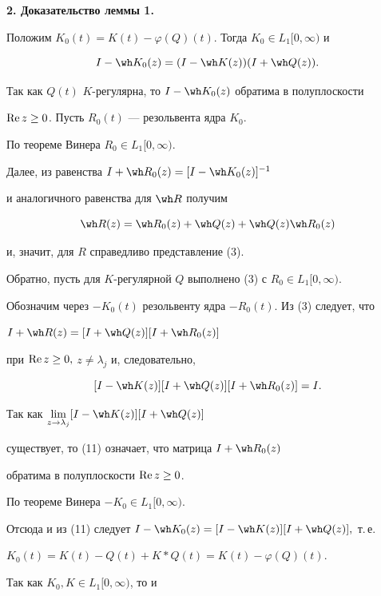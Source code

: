{\bf 2. Доказательство леммы 1.}


Положим $K_0(t)=K(t)-\varphi (Q)(t).$ Тогда $K_0\in L_1[0,\infty)$ и


$$


I-\wh K_0(z)=(I-\wh K(z))(I+\wh Q(z)).


$$


Так как $Q(t)$\; $K$-регулярна, то $I-\wh K_0(z)$ обратима в полуплоскости


$\operatorname{Re} z\geq 0$. Пусть $R_0(t)$ --- резольвента ядра $K_0$.


По теореме Винера $R_0\in L_1[0,\infty)$.


Далее, из равенства $I+\wh R_0(z)=[I-\wh K_0(z)]^{-1}$


и аналогичного равенства для $\wh R$ получим


$$


\wh R(z)=\wh R_0(z)+\wh Q(z)+\wh Q(z)\wh R_0(z)


$$


и, значит, для $R$ справедливо представление (3).





Обратно, пусть для $K$-регулярной $Q$ выполнено (3) с $R_0\in L_1[0,\infty)$.


Обозначим через $-K_0(t)$ резольвенту ядра $-R_0(t)$. Из (3) следует, что


$I+\wh R(z)=[I+\wh Q(z)][I+\wh R_0(z)]$


при $\operatorname{Re} z\geq 0,$ $z\neq \lambda_j$ и, следовательно,


\begin{equation}


[I-\wh K(z)][I+\wh Q(z)][I+\wh R_0(z)]=I.


\end{equation}


Так как $\lim\limits_{z\rightarrow \lambda_j }[I-\wh K(z)][I+\wh Q(z)]$


существует, то (11) означает, что матрица $I+\wh R_0(z)$


обратима в полуплоскости $\operatorname{Re} z\geq 0$.


По теореме Винера $-K_0\in L_1[0,\infty)$.





Отсюда и из (11) следует $I-\wh K_0(z)=[I-\wh K(z)][I+\wh Q(z)],$ т.\,е.


$K_0(t)=K(t)-Q(t)+K*Q(t)=K(t)-\varphi (Q)(t).$


Так как $K_0,K\in L_1[0,\infty)$, то и


